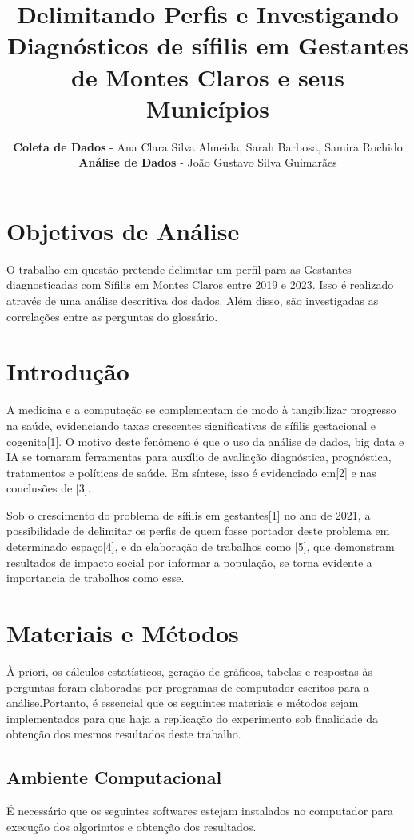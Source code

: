 \documentclass[a4paper]{article}
\title{Delimitando Perfis e Investigando Diagnósticos de sífilis em Gestantes de Montes Claros e seus Municípios}
\author{
\textbf{Coleta de Dados} - Ana Clara Silva Almeida, Sarah Barbosa, Samira Rochido
\\
\textbf{Análise de Dados} - João Gustavo Silva Guimarães
}
\begin{document}
\maketitle

\begin{multicols}
\setlength{\parskip}{0.1in}
\setlength{\parindent}{15pt}


\section{Objetivos de Análise}

O trabalho em questão pretende delimitar um perfil para as Gestantes diagnosticadas com Sífilis em Montes Claros entre 2019 e 2023. Isso é realizado através de uma análise descritiva dos dados. Além disso, são investigadas as correlações entre as perguntas do glossário.



\section{Introdução}
A medicina e a computação se complementam de modo à tangibilizar progresso na saúde, evidenciando taxas crescentes significativas de sífilis gestacional e cogenita[1]. O motivo deste fenômeno é que o uso da análise de dados, big data e IA se tornaram ferramentas para auxílio de avaliação diagnóstica, prognóstica, tratamentos e políticas de saúde. Em síntese, isso é evidenciado em[2] e nas conclusões de [3].

Sob o crescimento do problema de sífilis em gestantes[1] no ano de 2021, a possibilidade de delimitar os perfis de quem fosse portador deste problema em determinado espaço[4], e da elaboração de trabalhos como [5], que demonstram resultados de impacto social por informar a população, se torna evidente a importancia de trabalhos como esse.

\section{Materiais e Métodos}
À priori, os cálculos estatísticos, geração de gráficos, tabelas e respostas às perguntas foram elaboradas por programas de computador escritos para a análise.Portanto, é essencial que os seguintes materiais e métodos sejam implementados para que haja a replicação do experimento sob finalidade da obtenção dos mesmos resultados deste trabalho.

\subsection{Ambiente Computacional}
É necessário que os seguintes softwares estejam instalados no computador para execução dos algorimtos e obtenção dos resultados.


\end{multicols}
\end{document}
